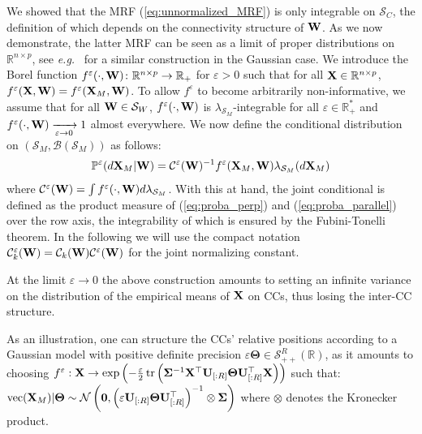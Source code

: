 We showed that the MRF (\ref{eq:unnormalized_MRF}) is only integrable on $\mathcal{S}_{C}$, the definition of which depends on the connectivity structure of $\mathbf{W}$. As we now demonstrate, the latter MRF can be seen as a limit of proper distributions on $\mathbb{R}^{n \times p}$, see \textit{e.g.}\ \cite{rue2005gaussian} for a similar construction in the Gaussian case. 
We introduce the Borel function $f^{\varepsilon}(\cdot, \mathbf{W}) \colon \mathbb{R}^{n \times p} \to \mathbb{R}_+$ for $\varepsilon > 0$ such that for all $\mathbf{X} \in \mathbb{R}^{n \times p}$, $f^{\varepsilon}(\mathbf{X}, \mathbf{W}) = f^{\varepsilon}(\mathbf{X}_{M}, \mathbf{W})$. To allow $f^{\varepsilon}$ to become arbitrarily non-informative, we assume that for all $\mathbf{W} \in \mathcal{S}_{W}$, $f^\varepsilon(\cdot, \mathbf{W})$ is $\lambda_{\mathcal{S}_{M}}$-integrable for all $\varepsilon \in \mathbb{R}^*_+$ and $f^{\varepsilon}(\cdot, \mathbf{W}) \xrightarrow[\varepsilon \to 0]{} 1$ almost everywhere.
We now define the conditional distribution on $(\mathcal{S}_{M}, \mathcal{B}(\mathcal{S}_{M}))$ as follows:
\begin{align}\label{eq:proba_parallel}
     \mathbb{P}^{\varepsilon}(d\mathbf{X}_{M}| \mathbf{W}) = \mathcal{C}^{\varepsilon}(\mathbf{W})^{-1} f^{\varepsilon}(\mathbf{X}_{M}, \mathbf{W}) \lambda_{\mathcal{S}_{M}}(d\mathbf{X}_{M})
\end{align}
where $\mathcal{C}^{\varepsilon}(\mathbf{W}) = \int f^{\varepsilon}(\cdot, \mathbf{W}) d\lambda_{\mathcal{S}_{M}}$.
With this at hand, the joint conditional is defined as the product measure of (\ref{eq:proba_perp}) and (\ref{eq:proba_parallel}) over the row axis, the integrability of which is ensured by the Fubini-Tonelli theorem. In the following we will use the compact notation $\mathcal{C}^{\varepsilon}_k(\mathbf{W}) = \mathcal{C}_k(\mathbf{W})\mathcal{C}^{\varepsilon}(\mathbf{W})$ for the joint normalizing constant.

\begin{remark}
At the limit $\varepsilon \to 0$ the above construction amounts to setting an infinite variance on the distribution of the empirical means of $\mathbf{X}$ on CCs, thus losing the inter-CC structure. 
\end{remark}

As an illustration, one can structure the CCs' relative positions according to a Gaussian model with positive definite precision $\varepsilon \bm{\Theta} \in \mathcal{S}_{++}^R(\mathbb{R})$, as it amounts to choosing $f^{\varepsilon} : \mathbf{X} \to \exp \left(-\frac{\varepsilon}{2} \operatorname{tr}\left(\mathbf{\Sigma}^{-1}\mathbf{X}^\top\mathbf{U}_{[:R]}  \bm{\Theta}\mathbf{U}^\top_{[:R]} \mathbf{X}\right)\right)$ such that: $\mathrm{vec}(\mathbf{X}_{M}) | \bm{\Theta} \sim \mathcal{N}\left(\bm{0}, \left(\varepsilon \mathbf{U}_{[:R]}  \bm{\Theta}\mathbf{U}^\top_{[:R]}\right)^{-1} \otimes \mathbf{\Sigma}\right)$ where $\otimes$ denotes the Kronecker product.